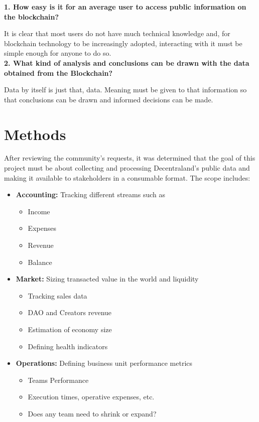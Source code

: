 \documentclass[MSE,Master,english]{twbook}%
\begin{document}
\textbf{1. How easy is it for an average user to access public information on the blockchain?}

It is clear that most users do not have much technical knowledge and, for blockchain technology to be increasingly adopted, interacting with it must be simple enough for anyone to do so. \\

\textbf{2. What kind of analysis and conclusions can be drawn with the data obtained from the Blockchain?}

Data by itself is just that, data. Meaning must be given to that information so that conclusions can be drawn and informed decisions can be made.

\section{Methods\label{methods}}
After reviewing the community's requests, it was determined that the goal of this project must be about collecting and processing Decentraland's public data and making it available to stakeholders in a consumable format. The scope includes:

\begin{itemize}
  \item \textbf{Accounting:} Tracking different streams such as
  \begin{itemize}
    \item Income
    \item Expenses
    \item Revenue
    \item Balance
  \end{itemize}
  \item \textbf{Market:} Sizing transacted value in the world and liquidity
  \begin{itemize}
    \item Tracking sales data
    \item DAO and Creators revenue
    \item Estimation of economy size
    \item Defining health indicators
  \end{itemize}
  \item \textbf{Operations:} Defining business unit performance metrics
  \begin{itemize}
    \item Teams Performance
    \item Execution times, operative expenses, etc.
    \item Does any team need to shrink or expand?
  \end{itemize}
\end{itemize}
\end{document}
